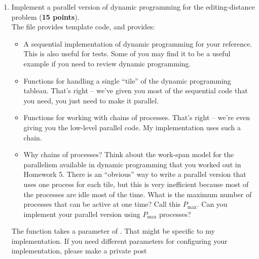\documentclass{article}
\begin{document}
\begin{enumerate}
          \begin{enumerate}
              \item Implement a parallel version of dynamic programming for the editing-distance problem
                    (\textbf{15 points}).\\
                    The file 
                    provides template code, and
                    provides:
                    \begin{itemize}
                        \item A sequential implementation of dynamic programming for your reference.
                              This is also useful for tests.  Some of you may find it to be a useful example
                              if you need to review dynamic programming.
                        \item Functions for handling a single ``tile'' of the dynamic programming tableau.
                              That's right -- we've given you most of the sequential code that you need, you
                              just need to make it parallel.
                        \item Functions for working with chains of processes.
                              That's right -- we're even giving you the low-level parallel code.
                              My implementation uses such a chain.
                        \item Why chains of processes?  Think about the work-span model for the parallelism
                              available in dynamic programming that you worked out in Homework 5.
                              There is an ``obvious'' way to write a parallel version that uses one process for
                              each tile, but this is very inefficient because most of the processes are idle most of the time.
                              What is the maximum number of processes that can be active at one time?
                              Call this $P_{\max}$.
                              Can you implement your parallel version using $P_{\max}$ processes?
                    \end{itemize}
                    The  function takes a parameter of .
                    That might be specific to my implementation.  If you need different
                    parameters for configuring your implementation, please make a private post

\end{enumerate}
\end{enumerate}
\end{document}
